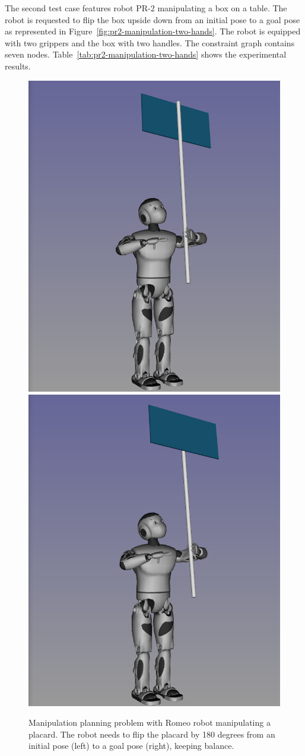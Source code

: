 The second test case features robot PR-2 manipulating a box on a table. The robot is requested to flip the box upside down from an initial pose to a goal pose as represented in Figure~\ref{fig:pr2-manipulation-two-hands}. The robot is equipped with two grippers and the box with two handles. The constraint graph contains seven nodes. Table~\ref{tab:pr2-manipulation-two-hands} shows the experimental results.


\begin{figure}
  \begin{center}
    \includegraphics[width=.49\linewidth]{figures/romeo-placard-init.png}
    \includegraphics[width=.49\linewidth]{figures/romeo-placard-goal.png}    
  \end{center}
  \caption{Manipulation planning problem with Romeo robot manipulating a placard. The robot needs to flip the placard by 180 degrees from an initial pose (left) to a goal pose (right), keeping balance.}
  \label{fig:romeo-placard}
\end{figure}

